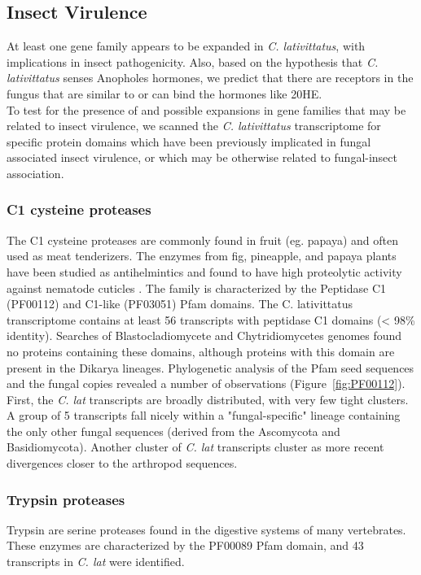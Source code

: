\subsection*{Insect Virulence} 
At least one gene family appears to be expanded in \textit{C. lativittatus}, with implications in insect pathogenicity. Also, based on the hypothesis that \textit{C. lativittatus} senses Anopholes hormones, we predict that there are receptors in the fungus that are similar to or can bind the hormones like 20HE. \\
\indent To test for the presence of and possible expansions in gene families that may be related to insect virulence, we scanned the \textit{C. lativittatus} transcriptome for specific protein domains which have been previously implicated in fungal associated insect virulence, or which may be otherwise related to fungal-insect association. \\
\subsubsection*{C1 cysteine proteases} 
The C1 cysteine proteases are commonly found in fruit (eg. papaya) and often used as meat tenderizers. The enzymes from fig, pineapple, and papaya plants have been studied as antihelmintics and found to have high proteolytic activity against nematode cuticles \cite{Stepek2004}. The family is characterized by the Peptidase C1 (PF00112) and C1-like (PF03051) Pfam domains. The C. lativittatus transcriptome contains at least 56 transcripts with peptidase C1 domains (< 98\% identity). Searches of Blastocladiomycete and Chytridiomycetes genomes found no proteins containing these domains, although proteins with this domain are present in the Dikarya lineages. Phylogenetic analysis of the Pfam seed sequences and the fungal copies revealed a number of observations (Figure~\ref{fig:PF00112}). First, the \textit{C. lat} transcripts are broadly distributed, with very few tight clusters. A group of 5 transcripts fall nicely within a "fungal-specific" lineage containing the only other fungal sequences (derived from the Ascomycota and Basidiomycota). Another cluster of \textit{C. lat} transcripts cluster as more recent divergences closer to the arthropod sequences. \\
\subsubsection*{Trypsin proteases}
Trypsin are serine proteases found in the digestive systems of many vertebrates. These enzymes are characterized by the PF00089 Pfam domain, and 43 transcripts in \textit{C. lat} were identified.\\
